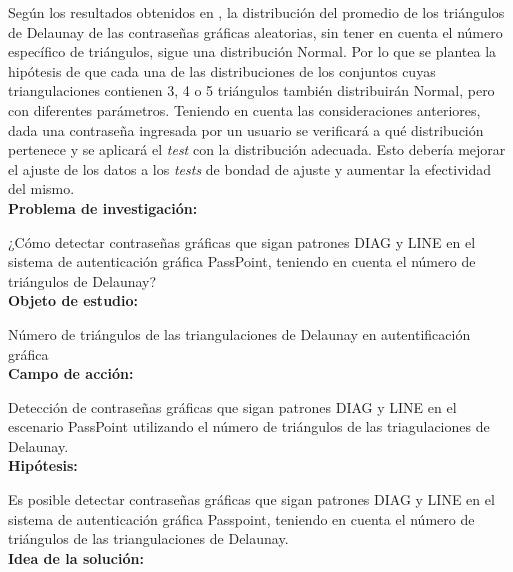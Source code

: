 \documentclass[12pt]{report}
\begin{document}
	
	Según los resultados obtenidos en \cite{13}, la distribución del promedio de los triángulos de  Delaunay de las contraseñas gráficas aleatorias, sin tener en cuenta el número específico de triángulos, sigue una distribución Normal. Por lo que se plantea la hipótesis de que cada una de las distribuciones de los conjuntos cuyas triangulaciones contienen 3, 4 o 5 triángulos también distribuirán Normal, pero con diferentes parámetros. Teniendo en cuenta las consideraciones anteriores, dada una contraseña ingresada por un usuario se verificará a qué distribución pertenece y se aplicará el \textit{test} con la distribución adecuada. Esto debería mejorar el ajuste de los datos a los \textit{tests} de bondad de ajuste y aumentar la efectividad del mismo.\\
	
\large{\textbf{Problema de investigación:}}	

\normalsize{¿Cómo  detectar contraseñas gráficas que sigan patrones DIAG y LINE  en el sistema de autenticación gráfica PassPoint, teniendo en cuenta el número de triángulos de Delaunay?}\\
	
	\large{\textbf{Objeto de estudio:}}
	
	\normalsize{Número de triángulos de las  triangulaciones de Delaunay  en autentificación gráfica}\\
	
		   
	\large{\textbf{Campo de acción:}}
	
	\normalsize{Detección de contraseñas gráficas que sigan patrones DIAG y LINE en el escenario PassPoint   utilizando  el número de triángulos de las triagulaciones de Delaunay}.\\
	 
	\large{\textbf{Hipótesis:}}

	\normalsize{Es posible detectar contraseñas gráficas que sigan patrones DIAG y LINE en el sistema de autenticación gráfica Passpoint, teniendo en cuenta el número de triángulos  de las triangulaciones de Delaunay}.\\
		
	
	\large{\textbf{Idea de la solución:}}
	
\end{document}
